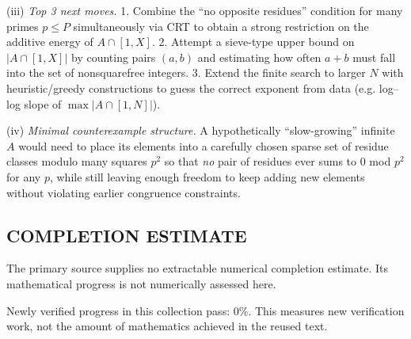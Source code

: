 (iii) \emph{Top 3 next moves.}
1. Combine the ``no opposite residues'' condition for many primes $p\le P$ simultaneously via CRT to obtain a strong restriction on the additive energy of $A\cap[1,X]$.
2. Attempt a sieve-type upper bound on $|A\cap[1,X]|$ by counting pairs $(a,b)$ and estimating how often $a+b$ must fall into the set of nonsquarefree integers.
3. Extend the finite search to larger $N$ with heuristic/greedy constructions to guess the correct exponent from data (e.g. log--log slope of $\max|A\cap[1,N]|$).

(iv) \emph{Minimal counterexample structure.} A hypothetically ``slow-growing'' infinite $A$ would need to place its elements into a carefully chosen sparse set of residue classes modulo many squares $p^2$ so that \emph{no} pair of residues ever sums to $0$ mod $p^2$ for any $p$, while still leaving enough freedom to keep adding new elements without violating earlier congruence constraints.




\subsection*{COMPLETION ESTIMATE}
The primary source supplies no extractable numerical completion estimate. Its mathematical progress is not numerically assessed here.

Newly verified progress in this collection pass: $0\%$. This measures new verification work, not the amount of mathematics achieved in the reused text.
